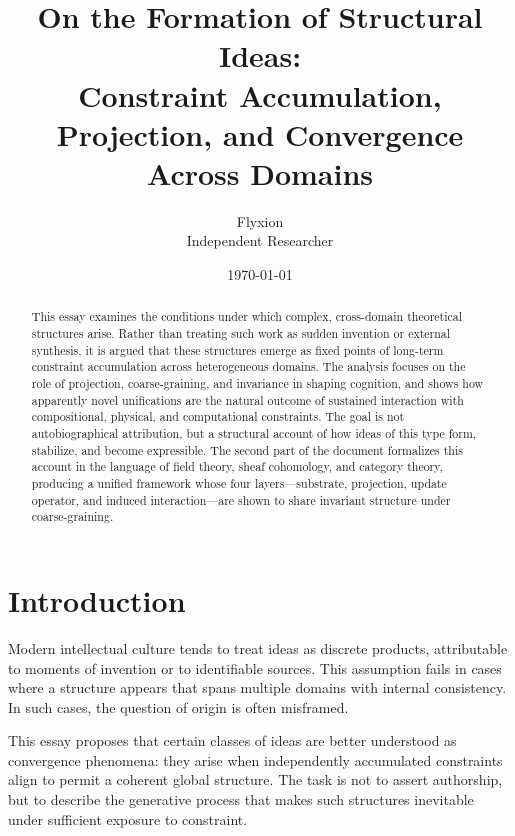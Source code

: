 \documentclass[11pt]{article}
\title{On the Formation of Structural Ideas:\\
Constraint Accumulation, Projection, and Convergence Across Domains}
\author{Flyxion\\[2pt]
\small Independent Researcher}
\date{\today}
\theoremstyle{plain}
\theoremstyle{definition}
\theoremstyle{remark}
\begin{document}

\maketitle

\vspace{1em}

\begin{abstract}
This essay examines the conditions under which complex, cross-domain theoretical
structures arise. Rather than treating such work as sudden invention or
external synthesis, it is argued that these structures emerge as fixed points
of long-term constraint accumulation across heterogeneous domains. The
analysis focuses on the role of projection, coarse-graining, and invariance
in shaping cognition, and shows how apparently novel unifications are the
natural outcome of sustained interaction with compositional, physical, and
computational constraints. The goal is not autobiographical attribution, but
a structural account of how ideas of this type form, stabilize, and become
expressible. The second part of the document formalizes this account in the
language of field theory, sheaf cohomology, and category theory, producing
a unified framework whose four layers---substrate, projection, update
operator, and induced interaction---are shown to share invariant structure
under coarse-graining.
\end{abstract}

\newpage
\tableofcontents
\newpage


\section{Introduction}

Modern intellectual culture tends to treat ideas as discrete products,
attributable to moments of invention or to identifiable sources. This
assumption fails in cases where a structure appears that spans multiple
domains with internal consistency. In such cases, the question of origin
is often misframed.

This essay proposes that certain classes of ideas are better understood
as convergence phenomena: they arise when independently accumulated
constraints align to permit a coherent global structure. The task is
not to assert authorship, but to describe the generative process that
makes such structures inevitable under sufficient exposure to constraint.
\end{document}
